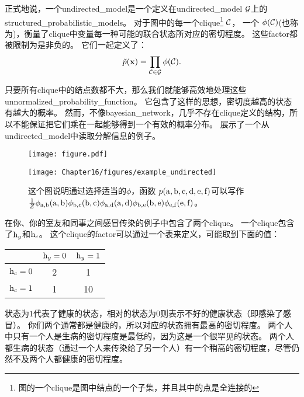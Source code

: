 正式地说，一个\gls{undirected_model}是一个定义在\gls{undirected_model} $\mathcal{G}$上的\gls{structured_probabilistic_models}。
对于图中的每一个\gls{clique}\footnote{图的一个\gls{clique}是图中结点的一个子集，并且其中的点是全连接的}$~\mathcal{C}$，
一个 $\phi(\mathcal{C})$(也称为)，衡量了\gls{clique}中变量每一种可能的联合状态所对应的密切程度。
这些\gls{factor}都被限制为是非负的。
它们一起定义了：
\begin{align}
\label{eqn:163}
\tilde{p}(\mathbf{x}) = \prod_{\mathcal{C}\in\mathcal{G}} \phi(\mathcal{C}).
\end{align}


只要所有\gls{clique}中的结点数都不大，那么我们就能够高效地处理这些\gls{unnormalized_probability_function}。
它包含了这样的思想，密切度越高的状态有越大的概率。
然而，不像\gls{bayesian_network}，几乎不存在\gls{clique}定义的结构，所以不能保证把它们乘在一起能够得到一个有效的概率分布。
展示了一个从\gls{undirected_model}中读取分解信息的例子。

\begin{figure}[!htb]
\ifOpenSource
\centerline{\texttt{[image: figure.pdf]}}
\else
	\centerline{\texttt{[image: Chapter16/figures/example\_undirected]}}
\fi
	\caption{这个图说明通过选择适当的$\phi$，函数
		$p(\mathrm{a},\mathrm{b},\mathrm{c},\mathrm{d},\mathrm{e},\mathrm{f})$可以写作
		$\frac{1}{Z}\phi_{\mathrm{a},\mathrm{b}}(\mathrm{a},\mathrm{b})\phi_{\mathrm{b},\mathrm{c}}(\mathrm{b},\mathrm{c})\phi_{\mathrm{a},\mathrm{d}}(\mathrm{a},\mathrm{d})\phi_{\mathrm{b},\mathrm{e}}(\mathrm{b},\mathrm{e})\phi_{\mathrm{e},\mathrm{f}}(\mathrm{e},\mathrm{f})$。}
	\label{fig:example_undirected}
\end{figure}



在你、你的室友和同事之间感冒传染的例子中包含了两个\gls{clique}。
一个\gls{clique}包含了$\mathrm{h}_y$和$\mathrm{h}_c$。
这个\gls{clique}的\gls{factor}可以通过一个表来定义，可能取到下面的值：
\begin{table}
	\centering
\begin{tabular}{c|cc}
		& $\mathrm{h}_y = 0$ & $\mathrm{h}_y = 1$ \\ \hline
		$\mathrm{h}_c = 0$ & 2 & 1 \\
		$\mathrm{h}_c = 1$  & 1 & 10 \\
\end{tabular}
\end{table}


状态为$1$代表了健康的状态，相对的状态为$0$则表示不好的健康状态（即感染了感冒）。
你们两个通常都是健康的，所以对应的状态拥有最高的密切程度。
两个人中只有一个人是生病的密切程度是最低的，因为这是一个很罕见的状态。
两个人都生病的状态（通过一个人来传染给了另一个人）有一个稍高的密切程度，尽管仍然不及两个人都健康的密切程度。


